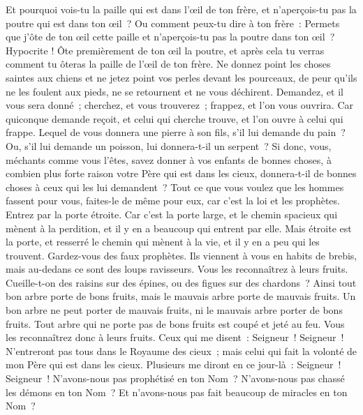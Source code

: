 \begin{multicols}{2}
Et pourquoi vois-tu la paille qui est dans l'œil de ton frère, et n'aperçois-tu pas la poutre qui est dans ton œil~?
Ou comment peux-tu dire à ton frère~: Permets que j'ôte de ton œil cette paille et n'aperçois-tu pas la poutre dans ton œil~?
Hypocrite ! Ôte premièrement de ton œil la poutre, et après cela tu verras comment tu ôteras la paille de l'œil de ton frère.
Ne donnez point les choses saintes aux chiens et ne jetez point vos perles devant les pourceaux, de peur qu'ils ne les foulent aux pieds, ne se retournent et ne vous déchirent.
Demandez, et il vous sera donné~; cherchez, et vous trouverez~; frappez, et l'on vous ouvrira.
Car quiconque demande reçoit, et celui qui cherche trouve, et l'on ouvre à celui qui frappe.
Lequel de vous donnera une pierre à son fils, s'il lui demande du pain~?
Ou, s'il lui demande un poisson, lui donnera-t-il un serpent~?
Si donc, vous, méchants comme vous l'êtes, savez donner à vos enfants de bonnes choses, à combien plus forte raison votre Père qui est dans les cieux, donnera-t-il de bonnes choses à ceux qui les lui demandent~?
Tout ce que vous voulez que les hommes fassent pour vous, faites-le de même pour eux, car c'est la loi et les prophètes.
Entrez par la porte étroite. Car c'est la porte large, et le chemin spacieux qui mènent à la perdition, et il y en a beaucoup qui entrent par elle.
Mais étroite est la porte, et resserré le chemin qui mènent à la vie, et il y en a peu qui les trouvent.
Gardez-vous des faux prophètes. Ils viennent à vous en habits de brebis, mais au-dedans ce sont des loups ravisseurs.
Vous les reconnaîtrez à leurs fruits. Cueille-t-on des raisins sur des épines, ou des figues sur des chardons~?
Ainsi tout bon arbre porte de bons fruits, mais le mauvais arbre porte de mauvais fruits.
Un bon arbre ne peut porter de mauvais fruits, ni le mauvais arbre porter de bons fruits.
Tout arbre qui ne porte pas de bons fruits est coupé et jeté au feu.
Vous les reconnaîtrez donc à leurs fruits.
Ceux qui me disent~: Seigneur~! Seigneur~! N'entreront pas tous dans le Royaume des cieux~; mais celui qui fait la volonté de mon Père qui est dans les cieux.
Plusieurs me diront en ce jour-là~: Seigneur~! Seigneur~! N'avons-nous pas prophétisé en ton Nom~? N'avons-nous pas chassé les démons en ton Nom~? Et n'avons-nous pas fait beaucoup de miracles en ton Nom~?

\end{multicols}
